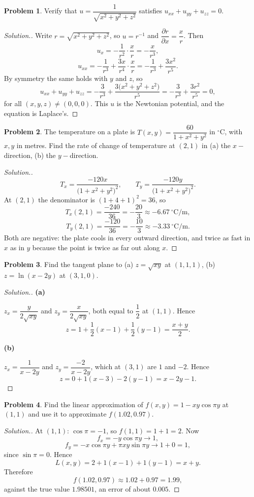 \documentclass[11pt,a4paper]{article}
\theoremstyle{definition}
\newtheorem{problemx}{Problem}[subsection]
\newenvironment{problem}{\begin{problemx}}{\end{problemx}}
\newenvironment{solution}
  {\renewcommand{\qedsymbol}{}\begin{proof}[\textit{Solution}.]}
  {\end{proof}}
\newcommand{\subhead}[1]{%
  \par\medskip\noindent\textbf{#1}\par\nobreak\smallskip}
\begin{document}
\begin{problem}
Verify that $u = \dfrac{1}{\sqrt{x^2+y^2+z^2}}$ satisfies
$u_{xx}+u_{yy}+u_{zz} = 0$.
\end{problem}
\begin{solution}
Write $r = \sqrt{x^2+y^2+z^2}$, so $u = r^{-1}$ and
$\dfrac{\partial r}{\partial x} = \dfrac{x}{r}$. Then
$$u_x = -\frac{1}{r^2}\cdot\frac{x}{r} = -\frac{x}{r^3},$$
$$u_{xx} = -\frac{1}{r^3} + \frac{3x}{r^4}\cdot\frac{x}{r}
= -\frac{1}{r^3} + \frac{3x^2}{r^5}.$$
By symmetry the same holds with $y$ and $z$, so
$$u_{xx}+u_{yy}+u_{zz}
= -\frac{3}{r^3} + \frac{3\big(x^2+y^2+z^2\big)}{r^5}
= -\frac{3}{r^3} + \frac{3r^2}{r^5} = 0 ,$$
for all $(x,y,z)\neq(0,0,0)$. This $u$ is the Newtonian potential, and the
equation is Laplace's.
\end{solution}

\begin{problem}
The temperature on a plate is $T(x,y) = \dfrac{60}{1+x^2+y^2}$ in ${}^{\circ}$C,
with $x,y$ in metres. Find the rate of change of temperature at $(2,1)$ in
(a) the $x-$direction, (b) the $y-$direction.
\end{problem}
\begin{solution}
$$T_x = \frac{-120x}{\big(1+x^2+y^2\big)^2},\qquad
T_y = \frac{-120y}{\big(1+x^2+y^2\big)^2}.$$
At $(2,1)$ the denominator is $(1+4+1)^2 = 36$, so
$$T_x(2,1) = \frac{-240}{36} = -\frac{20}{3}\approx -6.67\ ^{\circ}\text{C/m},$$
$$T_y(2,1) = \frac{-120}{36} = -\frac{10}{3}\approx -3.33\ ^{\circ}\text{C/m}.$$
Both are negative: the plate cools in every outward direction, and twice as fast
in $x$ as in $y$ because the point is twice as far out along $x$.
\end{solution}

\begin{problem}
Find the tangent plane to
(a) $z = \sqrt{xy}$ at $(1,1,1)$, \quad (b) $z = \ln(x-2y)$ at $(3,1,0)$.
\end{problem}
\begin{solution}
\subhead{(a)}
$z_x = \dfrac{y}{2\sqrt{xy}}$ and $z_y = \dfrac{x}{2\sqrt{xy}}$, both equal to
$\dfrac12$ at $(1,1)$. Hence
$$z = 1 + \frac12(x-1) + \frac12(y-1) = \frac{x+y}{2}.$$

\subhead{(b)}
$z_x = \dfrac{1}{x-2y}$ and $z_y = \dfrac{-2}{x-2y}$, which at $(3,1)$ are $1$
and $-2$. Hence
$$z = 0 + 1(x-3) - 2(y-1) = x-2y-1 .$$
\end{solution}

\begin{problem}
Find the linear approximation of $f(x,y) = 1-xy\cos\pi y$ at $(1,1)$ and use it
to approximate $f(1.02, 0.97)$.
\end{problem}
\begin{solution}
At $(1,1)$: $\cos\pi = -1$, so $f(1,1) = 1+1 = 2$. Now
$$f_x = -y\cos\pi y \longrightarrow 1,$$
$$f_y = -x\cos\pi y + \pi xy\sin\pi y \longrightarrow 1 + 0 = 1 ,$$
since $\sin\pi = 0$. Hence
$$L(x,y) = 2 + 1(x-1) + 1(y-1) = x+y .$$
Therefore
$$f(1.02, 0.97)\approx 1.02+0.97 = 1.99 ,$$
against the true value $1.98501$, an error of about $0.005$.
\end{solution}
\end{document}
